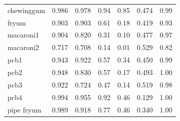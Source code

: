 \begin{table}[!t]
\begin{tabular}{@{}lcccccc@{}}
chewinggum & 0.986 & 0.978 & 0.94 & 0.85 & 0.474 & 0.99 \\
fryum & 0.903 & 0.903 & 0.61 & 0.18 & 0.419 & 0.93 \\
macaroni1 & 0.904 & 0.820 & 0.31 & 0.10 & 0.477 & 0.97 \\
macaroni2 & 0.717 & 0.708 & 0.14 & 0.01 & 0.529 & 0.82 \\
pcb1 & 0.943 & 0.922 & 0.57 & 0.34 & 0.450 & 0.99 \\
pcb2 & 0.948 & 0.830 & 0.57 & 0.17 & 0.493 & 1.00 \\
pcb3 & 0.922 & 0.724 & 0.47 & 0.14 & 0.519 & 0.98 \\
pcb4 & 0.994 & 0.955 & 0.92 & 0.46 & 0.129 & 1.00 \\
pipe fryum & 0.989 & 0.918 & 0.77 & 0.46 & 0.340 & 1.00 \\
\bottomrule
\end{tabular}
\end{table}
